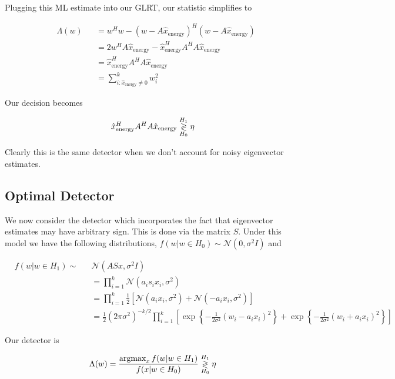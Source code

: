 \documentclass[english]{article}
\begin{document}
Plugging this ML estimate into our GLRT, our statistic simplifies to

\begin{equation}
\begin{aligned}
&\Lambda(w)
&&=w^Hw-\left(w-A\hat{x}_{\text{energy}}\right)^H\left(w-A\hat{x}_{\text{energy}}\right)\\
&&& = 2w^HA\hat{x}_{\text{energy}}-\hat{x}_{\text{energy}}^HA^HA\hat{x}_{\text{energy}}\\
&&& = \hat{x}_{\text{energy}}^HA^HA\hat{x}_{\text{energy}}\\
&&& = \sum_{i:\hat{x}_{\text{energy}}\neq0}^k w_i^2
\end{aligned}
\end{equation}

Our decision becomes

\begin{equation}
\hat{x}_{\text{energy}}^HA^HA\hat{x}_{\text{energy}}\overset{H_1}{\underset{H_0}{\gtrless}} \eta
\end{equation}

Clearly this is the same detector when we don't account for noisy eigenvector estimates.

\subsection{Optimal Detector}

We now consider the detector which incorporates the fact that eigenvector estimates may have arbitrary sign. This is done via the matrix $S$. Under this model we have the following distributions, $f(w|w\in H_0)\sim\mathcal{N}(0,\sigma^2I)$ and

\begin{equation}
\begin{aligned}
&f(w|w\in H_1)\sim
&&\mathcal{N}(ASx,\sigma^2I)\\
&&&=\prod_{i=1}^k\mathcal{N}(a_is_ix_i,\sigma^2)\\
&&&=\prod_{i=1}^k\frac{1}{2}\left[\mathcal{N}(a_ix_i,\sigma^2) + \mathcal{N}(-a_ix_i,\sigma^2)\right]\\
&&&=\frac{1}{2}\left(2\pi\sigma^2\right)^{-k/2}\prod_{i=1}^k\left[\exp\left\{-\frac{1}{2\sigma^2}\left(w_i-a_ix_i\right)^2\right\}+\exp\left\{-\frac{1}{2\sigma^2}\left(w_i+a_ix_i\right)^2\right\}\right]
\end{aligned}
\end{equation}

Our detector is

\begin{equation}
\Lambda(w) = \frac{\mathop{\rm argmax}_x f(w|w\in H_1)}{f(x|w\in H_0)}\overset{H_1}{\underset{H_0}{\gtrless}}\eta
\end{equation}
\end{document}

